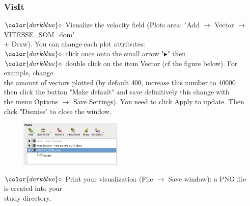 \documentclass[10pt, hyperref={unicode=true,pdfusetitle, bookmarks=true,bookmarksnumbered=false,bookmarksopen=false, breaklinks=false,pdfborder={0 0 1},backref=true,colorlinks=true,linkcolor=darkblue,pageanchor}]{beamer}
\begin{document}
\begin{frame}
\frametitle{VisIt}
\begin{block}{}

\hspace{1cm} $\color{darkblue}\circ$ {\small{Visualize the velocity field ({\footnotesize{Plots area: "Add $\rightarrow$ Vector $\rightarrow$ VITESSE\_SOM\_dom"}}\\
\hspace{1.3cm} {\footnotesize{ + Draw)}}. You can change each plot attributes:}}\\
\vspace{0.05cm}
\hspace{1.5cm} $\color{darkblue}\diamond$ {\footnotesize{click once onto the small arrow "$\blacktriangleright$" then }}\\
\hspace{1.5cm} $\color{darkblue}\diamond$ {\footnotesize{double click on the item Vector (cf the figure below). For example, change \\
\hspace{1.8cm} the amount of vectors plotted (by default 400, increase this number to 40000 \\
\hspace{1.8cm} then click the button "Make default" and save definitively this change with \\
\hspace{1.8cm} the menu Options $\rightarrow$ Save Settings). You need to click Apply to update. Then \\
\hspace{1.8cm} click "Dismiss" to close the window.}}\\

\begin{figure}
\includegraphics[width=0.45\textwidth]{PICTURES/visit3.jpg}
\end{figure}

\hspace{1cm} $\color{darkblue}\circ$ {\small{Print your visualization (File $\rightarrow$ Save window): a PNG file is created into your \\
\hspace{1.3cm} study directory.}}

\end{block}
\end{frame}
\end{document}
